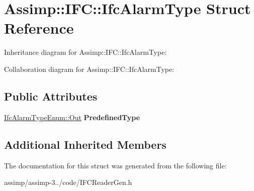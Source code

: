 \hypertarget{struct_assimp_1_1_i_f_c_1_1_ifc_alarm_type}{\section{Assimp\+:\+:I\+F\+C\+:\+:Ifc\+Alarm\+Type Struct Reference}
\label{struct_assimp_1_1_i_f_c_1_1_ifc_alarm_type}
}


Inheritance diagram for Assimp\+:\+:I\+F\+C\+:\+:Ifc\+Alarm\+Type\+:


Collaboration diagram for Assimp\+:\+:I\+F\+C\+:\+:Ifc\+Alarm\+Type\+:
\subsection*{Public Attributes}
\begin{DoxyCompactItemize}
\item 
\hypertarget{struct_assimp_1_1_i_f_c_1_1_ifc_alarm_type_a73d85eecaf2629445cdfe622e89c0019}{\hyperlink{classboost_1_1shared__ptr}{Ifc\+Alarm\+Type\+Enum\+::\+Out} {\bfseries Predefined\+Type}}\label{struct_assimp_1_1_i_f_c_1_1_ifc_alarm_type_a73d85eecaf2629445cdfe622e89c0019}

\end{DoxyCompactItemize}
\subsection*{Additional Inherited Members}


The documentation for this struct was generated from the following file\+:\begin{DoxyCompactItemize}
\item 
assimp/assimp-\/3../code/I\+F\+C\+Reader\+Gen.\+h\end{DoxyCompactItemize}
